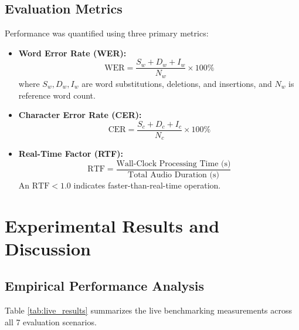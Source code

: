 \documentclass[conference]{IEEEtran}
\begin{document}
\subsection{Evaluation Metrics}
Performance was quantified using three primary metrics:
\begin{itemize}
    \item \textbf{Word Error Rate (WER):}
    \begin{equation}
    \text{WER} = \frac{S_w + D_w + I_w}{N_w} \times 100\%
    \end{equation}
    where $S_w, D_w, I_w$ are word substitutions, deletions, and insertions, and $N_w$ is reference word count.
    \item \textbf{Character Error Rate (CER):}
    \begin{equation}
    \text{CER} = \frac{S_c + D_c + I_c}{N_c} \times 100\%
    \end{equation}
    \item \textbf{Real-Time Factor (RTF):}
    \begin{equation}
    \text{RTF} = \frac{\text{Wall-Clock Processing Time (s)}}{\text{Total Audio Duration (s)}}
    \end{equation}
    An $\text{RTF} < 1.0$ indicates faster-than-real-time operation.
\end{itemize}

\section{Experimental Results and Discussion}

\subsection{Empirical Performance Analysis}
Table \ref{tab:live_results} summarizes the live benchmarking measurements across all 7 evaluation scenarios.
\end{document}
